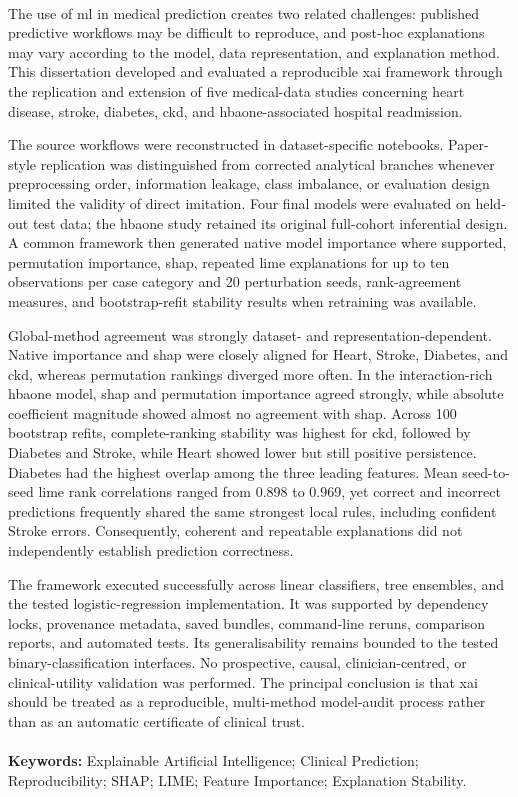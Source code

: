 \paragraph{}
The use of \gls{ml} in medical prediction creates two related challenges: published predictive workflows may be difficult to reproduce, and post-hoc explanations may vary according to the model, data representation, and explanation method. This dissertation developed and evaluated a reproducible \gls{xai} framework through the replication and extension of five medical-data studies concerning heart disease, stroke, diabetes, \gls{ckd}, and \gls{hbaone}-associated hospital readmission.

The source workflows were reconstructed in dataset-specific notebooks. Paper-style replication was distinguished from corrected analytical branches whenever preprocessing order, information leakage, class imbalance, or evaluation design limited the validity of direct imitation. Four final models were evaluated on held-out test data; the \gls{hbaone} study retained its original full-cohort inferential design. A common framework then generated native model importance where supported, permutation importance, \gls{shap}, repeated \gls{lime} explanations for up to ten observations per case category and 20 perturbation seeds, rank-agreement measures, and bootstrap-refit stability results when retraining was available.

Global-method agreement was strongly dataset- and representation-dependent. Native importance and \gls{shap} were closely aligned for Heart, Stroke, Diabetes, and \gls{ckd}, whereas permutation rankings diverged more often. In the interaction-rich \gls{hbaone} model, \gls{shap} and permutation importance agreed strongly, while absolute coefficient magnitude showed almost no agreement with \gls{shap}. Across 100 bootstrap refits, complete-ranking stability was highest for \gls{ckd}, followed by Diabetes and Stroke, while Heart showed lower but still positive persistence. Diabetes had the highest overlap among the three leading features. Mean seed-to-seed \gls{lime} rank correlations ranged from 0.898 to 0.969, yet correct and incorrect predictions frequently shared the same strongest local rules, including confident Stroke errors. Consequently, coherent and repeatable explanations did not independently establish prediction correctness.

The framework executed successfully across linear classifiers, tree ensembles, and the tested logistic-regression implementation. It was supported by dependency locks, provenance metadata, saved bundles, command-line reruns, comparison reports, and automated tests. Its generalisability remains bounded to the tested binary-classification interfaces. No prospective, causal, clinician-centred, or clinical-utility validation was performed. The principal conclusion is that \gls{xai} should be treated as a reproducible, multi-method model-audit process rather than as an automatic certificate of clinical trust.

\paragraph{}
\textbf{Keywords:} Explainable Artificial Intelligence; Clinical Prediction; Reproducibility; SHAP; LIME; Feature Importance; Explanation Stability.
